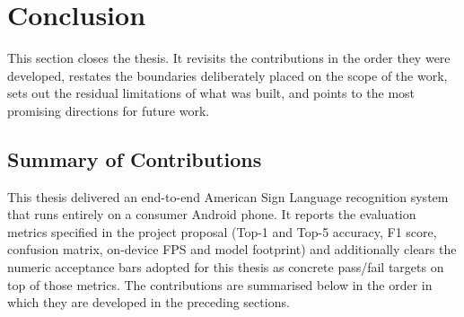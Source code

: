 \chapter{Conclusion}
\label{ch:conclusion}

This section closes the thesis. It revisits the contributions in the
order they were developed, restates the boundaries deliberately placed
on the scope of the work, sets out the residual limitations of what
was built, and points to the most promising directions for future
work.

\section{Summary of Contributions}
\label{sec:conclusion-summary}

This thesis delivered an end-to-end American Sign Language
recognition system that runs entirely on a consumer Android phone.
It reports the evaluation metrics specified in the project proposal
(Top-1 and Top-5 accuracy, F1 score, confusion matrix, on-device FPS
and model footprint) and additionally clears the numeric acceptance
bars adopted for this thesis as concrete pass/fail targets on top
of those metrics. The contributions are summarised below in the
order in which they are developed in the preceding sections.


